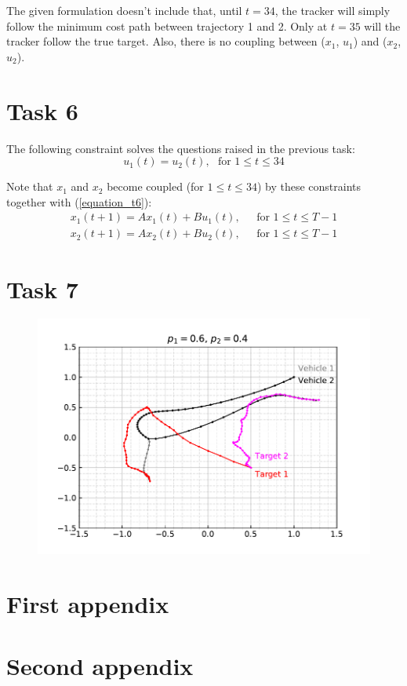 \documentclass[12pt]{article}
\begin{document}
The given formulation doesn't include that, until $t = 34$, the tracker will simply follow the minimum cost path between trajectory 1 and 2. Only at $t = 35$ will the tracker follow the true target. Also, there is no coupling between ($x_1$, $u_1$) and ($x_2$, $u_2$). \\

\section{Task 6}

The following constraint solves the questions raised in the previous task: \\
\vspace{-0.3em}
\begin{equation}
    \label{equation_t6}
    u_1(t) = u_{2}(t), \> \> \> \text{for } 1 \le t \le 34
\end{equation}

Note that $x_1$ and $x_2$ become coupled (for $1 \le t \le 34$) by these constraints together with (\ref{equation_t6}): \\
\vspace{-0.3em}
\begin{align*}
    x_1(t+1) = A x_1(t) + B u_1(t), \> \> \> &\text{for } 1 \le t \le T-1 \\
    x_2(t+1) = A x_2(t) + B u_2(t), \> \> \> &\text{for } 1 \le t \le T-1
\end{align*}

\section{Task 7}

\begin{figure}[H]
    \centering
    \includegraphics{../../src/tasks_5-7/output/ex_7.pdf}
\end{figure}






\appendix  
\clearpage
\addappheadtotoc 
\appendixpage 

\section{First appendix}

\lipsum[1]

\section{Second appendix}

\lipsum[1]
\end{document}
